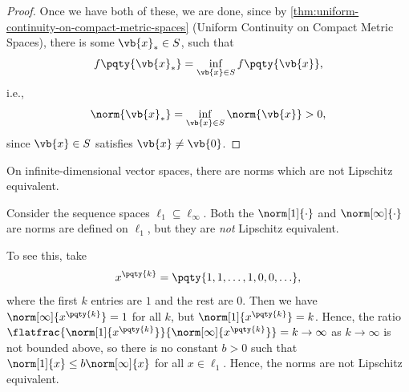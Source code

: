 \begin{proof}
    Once we have both of these, we are done, since by \autoref{thm:uniform-continuity-on-compact-metric-spaces} (Uniform Continuity on Compact Metric Spaces), there is some \(\vb{x}_{\ast} \in S\), such that
    \[
        f\pqty{\vb{x}_{\ast}} = \inf_{\vb{x} \in S} f\pqty{\vb{x}},
    \]
    i.e.,
    \[
        \norm{\vb{x}_{\ast}} = \inf_{\vb{x} \in S} \norm{\vb{x}} > 0,
    \]
    since \(\vb{x} \in S\) satisfies \(\vb{x} \neq \vb{0}\).
\end{proof}

On infinite-dimensional vector spaces, there are norms which are not Lipschitz equivalent.

\begin{example}
    Consider the sequence spaces \(\ell_1 \subseteq \ell_{\infty}\). Both the \(\norm[1]{\cdot}\) and \(\norm[\infty]{\cdot}\) are norms are defined on \(\ell_1\), but they are \emph{not} Lipschitz equivalent.

    To see this, take
    \[
        x^{\pqty{k}} = \pqty{1, 1, \ldots, 1, 0, 0, \ldots},
    \]
    where the first \(k\) entries are \(1\) and the rest are \(0\). Then we have
    \(\norm[\infty]{x^{\pqty{k}}} = 1\) for all \(k\), but \(\norm[1]{x^{\pqty{k}}} = k\). Hence, the ratio \(\flatfrac{\norm[1]{x^{\pqty{k}}}}{\norm[\infty]{x^{\pqty{k}}}} = k \to \infty\) as \(k \to \infty\) is not bounded above, so there is no constant \(b > 0\) such that \(\norm[1]{x} \leq b \norm[\infty]{x}\) for all \(x \in \ell_1\). Hence, the norms are not Lipschitz equivalent.
\end{example}